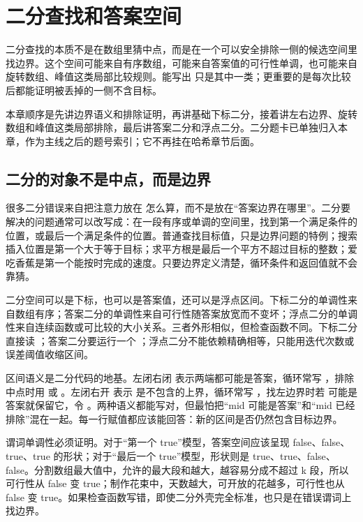 \chapter{二分查找和答案空间}

二分查找的本质不是在数组里猜中点，而是在一个可以安全排除一侧的候选空间里找边界。这个空间可能来自有序数组，可能来自答案值的可行性单调，也可能来自旋转数组、峰值这类局部比较规则。能写出  只是其中一类；更重要的是每次比较后都能证明被丢掉的一侧不含目标。

本章顺序是先讲边界语义和排除证明，再讲基础下标二分，接着讲左右边界、旋转数组和峰值这类局部排除，最后讲答案二分和浮点二分。二分题卡已单独归入本章，作为主线之后的题号索引；它不再挂在哈希章节后面。

\section{二分的对象不是中点，而是边界}

很多二分错误来自把注意力放在  怎么算，而不是放在“答案边界在哪里”。二分要解决的问题通常可以改写成：在一段有序或单调的空间里，找到第一个满足条件的位置，或最后一个满足条件的位置。普通查找目标值，只是边界问题的特例；搜索插入位置是第一个大于等于目标；求平方根是最后一个平方不超过目标的整数；爱吃香蕉是第一个能按时完成的速度。只要边界定义清楚，循环条件和返回值就不会靠猜。

二分空间可以是下标，也可以是答案值，还可以是浮点区间。下标二分的单调性来自数组有序；答案二分的单调性来自可行性随答案放宽而不变坏；浮点二分的单调性来自连续函数或可比较的大小关系。三者外形相似，但检查函数不同。下标二分直接读 ；答案二分要运行一个 ；浮点二分不能依赖精确相等，只能用迭代次数或误差阈值收缩区间。

区间语义是二分代码的地基。左闭右闭  表示两端都可能是答案，循环常写 ，排除中点时用  或 。左闭右开 \code{[left,right)} 表示  是不包含的上界，循环常写 ，找左边界时若  可能是答案就保留它，令 。两种语义都能写对，但最怕把“mid 可能是答案”和“mid 已经排除”混在一起。每一行赋值都应该能回答：新的区间是否仍然包含目标边界。

谓词单调性必须证明。对于“第一个 true”模型，答案空间应该呈现 false、false、true、true 的形状；对于“最后一个 true”模型，形状则是 true、true、false、false。分割数组最大值中，允许的最大段和越大，越容易分成不超过 k 段，所以可行性从 false 变 true；制作花束中，天数越大，可开放的花越多，可行性也从 false 变 true。如果检查函数写错，即使二分外壳完全标准，也只是在错误谓词上找边界。

